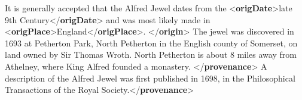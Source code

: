 \begin{shaded}
\hspace*{1em}\hspace*{1em}It is generally accepted that the Alfred Jewel dates from the {<\textbf{origDate}>}late 9th Century{</\textbf{origDate}>} and\mbox{}\newline 
\hspace*{1em}\hspace*{1em}\hspace*{1em}\hspace*{1em}\hspace*{1em}\hspace*{1em} was most likely made in {<\textbf{origPlace}>}England{</\textbf{origPlace}>}. {</\textbf{origin}>}\mbox{}\newline 
\hspace*{1em}\hspace*{1em}The jewel was discovered in 1693 at Petherton Park, North Petherton in the English county\mbox{}\newline 
\hspace*{1em}\hspace*{1em}\hspace*{1em}\hspace*{1em}\hspace*{1em}\hspace*{1em} of Somerset, on land owned by Sir Thomas Wroth. North Petherton is about 8 miles away from Athelney, where King\mbox{}\newline 
\hspace*{1em}\hspace*{1em}\hspace*{1em}\hspace*{1em}\hspace*{1em}\hspace*{1em} Alfred founded a monastery. {</\textbf{provenance}>}\mbox{}\newline 
\hspace*{1em}\hspace*{1em}A description of the Alfred Jewel was first published in 1698, in the Philosophical\mbox{}\newline 
\hspace*{1em}\hspace*{1em}\hspace*{1em}\hspace*{1em}\hspace*{1em}\hspace*{1em} Transactions of the Royal Society.{</\textbf{provenance}>}\mbox{}\newline 

\end{shaded}
